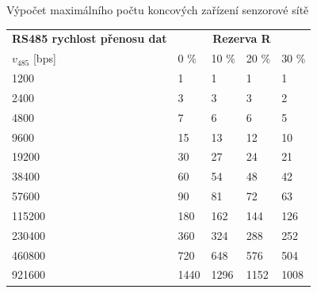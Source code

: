 \documentclass{beamer}
\begin{document}
\begin{frame} {Výpočet maximálního počtu koncových zařízení senzorové sítě}
	\begin{longtable} {|l|llll|}
			\hline
			\textbf{RS485 rychlost přenosu dat} &       \multicolumn{4}{c|}{\textbf{Rezerva R}}	  	    \\
			$v_{485}$ {[bps]}  &	0 \%	&	10 \%	&	20 \%	&	30 \%  \\ \hline
		
			1200~~~ &    1	&    1	&    1	&    1 \\
			2400~~~ &    3	&    3	&    3	&    2 \\
			4800~~~ &    7	&    6	&    6	&    5 \\
			9600~~~ &   15	&   13	&   12	&   10 \\
			19200~~~ &   30	&   27	&   24	&   21 \\
			38400~~~ &   60	&   54	&   48	&   42 \\
			57600~~~ &   90	&   81	&   72	&   63 \\
			115200~~~ &  180	&  162	&  144	&  126 \\
			230400~~~ &  360	&  324	&  288	&  252 \\
			460800~~~ &  720	&  648	&  576	&  504 \\
			921600~~~ & 1440	& 1296	& 1152	& 1008 \\
			\hline
		
		\end{longtable}
\end{frame}
\end{document}
